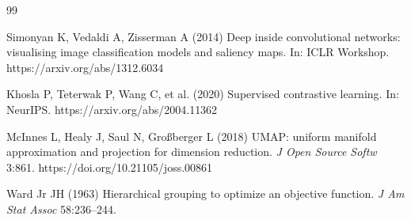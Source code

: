 \documentclass[12pt]{article}
\begin{document}
\begin{thebibliography}{99}


Simonyan K, Vedaldi A, Zisserman A (2014) Deep inside convolutional networks: visualising image classification models and saliency maps. In: ICLR Workshop. https://arxiv.org/abs/1312.6034



Khosla P, Teterwak P, Wang C, et al. (2020) Supervised contrastive learning. In: NeurIPS. https://arxiv.org/abs/2004.11362

McInnes L, Healy J, Saul N, Gro{\ss}berger L (2018) UMAP: uniform manifold approximation and projection for dimension reduction. \textit{J Open Source Softw} 3:861. https://doi.org/10.21105/joss.00861

Ward Jr JH (1963) Hierarchical grouping to optimize an objective function. \textit{J Am Stat Assoc} 58:236--244.



\end{thebibliography}
\end{document}
